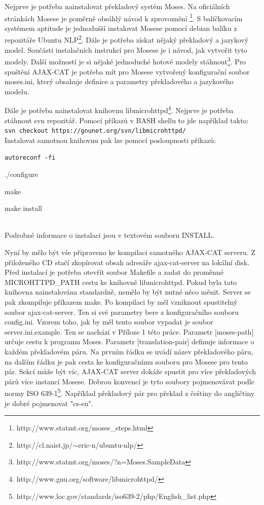 \documentclass[12pt,a4paper]{report}
\begin{document}
Nejprve je potřeba nainstalovat překladový systém Moses. Na oficiálních stránkách Mosese je poměrně obsáhlý návod k zprovoznění
\footnote{http://www.statmt.org/moses\_steps.html}. S balíčkovacím systémem aptitude je jednodušší instalovat Mosese pomocí debian balíku z repozitáře Ubuntu NLP\footnote{http://cl.naist.jp/$\sim$eric-n/ubuntu-nlp/}. Dále je potřeba získat nějaký překladový a jazykový model. Součástí instalačních instrukcí pro Mosese je i návod, jak vytvořit tyto modely. Další možností je si nějaké jednoduché hotové modely stáhnout\footnote{http://www.statmt.org/moses/?n=Moses.SampleData}. Pro spuštění AJAX-CAT je potřeba mít pro Mosese vytvořený konfigurační soubor moses.ini, který obsahuje definice a parametry překladového a jazykového modelu.

Dále je potřeba nainstalovat knihovnu libmicrohttpd\footnote{http://www.gnu.org/software/libmicrohttpd/}. Nejprve je potřeba stáhnout svn repozitář. Pomocí příkazů v BASH shellu to jde například takto: \\


{\tt svn checkout https://gnunet.org/svn/libmicrohttpd/ } \\


Instalovat samotnou knihovnu pak lze pomocí posloupnosti příkazů: \\


{\tt autoreconf -fi

./configure

make

make install} \\

Podrobné informace o instalaci jsou v textovém souboru INSTALL.

Nyní by mělo být vše připraveno ke kompilaci samotného AJAX-CAT serveru. Z přiloženého CD stačí zkopírovat obsah adresáře ajax-cat-server na lokální disk. Před instalací je potřeba otevřít soubor Makefile a zadat do proměnné MICROHTTPD\_PATH cestu ke knihovně libmicrohttpd. Pokud byla tato knihovna nainstalována standardně, nemělo by být nutné něco měnit. Server se pak zkompiluje příkazem make. Po kompilaci by měl vzniknout spustitelný soubor ajax-cat-server. Ten si své parametry bere z konfiguračního souboru config.ini. Vzorem toho, jak by měl tento soubor vypadat je soubor server.ini.example. Ten se nachází v Příloze 1 této práce. Parametr [moses-path] určuje cestu k programu Moses. Parametr [translation-pair] definuje informace o každém překladovém páru. Na prvním řádku se uvádí název překladového páru, na dalším řádku je pak cesta ke konfiguračnímu souboru pro Mosese pro tento pár. Sekcí může být víc, AJAX-CAT server dokáže spustit pro více překladových párů více instancí Mosese. Dobrou konvencí je tyto soubory pojmenovávat podle normy ISO 639-1\footnote{http://www.loc.gov/standards/iso639-2/php/English\_list.php}. Například překladový pár pro překlad z češtiny do angličtiny je dobré pojmenovat "cs-en".
\end{document}
